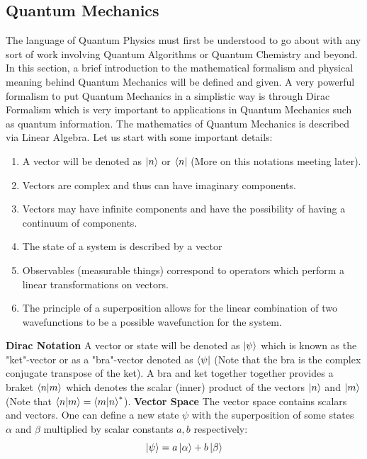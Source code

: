 \subsection{Quantum Mechanics}
The language of Quantum Physics must first be understood to go about with any sort of work involving Quantum Algorithms or Quantum Chemistry and beyond. In this section, a brief introduction to the mathematical formalism and physical meaning behind Quantum Mechanics will be defined and given. A very powerful formalism to put Quantum Mechanics in a simplistic way is through Dirac Formalism which is very important to applications in Quantum Mechanics such as quantum information. The mathematics of Quantum Mechanics is described via Linear Algebra. Let us start with some important details:
\begin{enumerate}
    \item A vector will be denoted as $\ket{n}$ or $\bra{n}$ (More on this notations meeting later).
    \item Vectors are complex and thus can have imaginary components. 
    \item Vectors may have infinite components and have the possibility of having a continuum of components.
    \item The state of a system is described by a vector
    \item Observables (measurable things) correspond to operators which perform a linear transformations on vectors.
    \item The principle of a superposition allows for the linear combination of two wavefunctions to be a possible wavefunction for the system.
\end{enumerate}
\newline
\textbf{Dirac Notation}\newline
A vector or state will be denoted as $\ket{\psi}$ which is known as the "ket"-vector or as a "bra"-vector denoted as $\bra{\psi}$ (Note that the bra is the complex conjugate transpose of the ket). A bra and ket together together provides a braket $\braket{n|m}$ which denotes the scalar (inner) product of the vectors $\ket{n}$ and $\ket{m}$ (Note that $\braket{n|m} = \braket{m|n}^{*}$). \newline
\textbf{Vector Space} \newline
The vector space contains scalars and vectors. One can define a new state $\psi$ with the superposition of some states $\alpha$ and $\beta$ multiplied by scalar constants $a, b$ respectively:
\begin{equation}
    \ket{\psi} = a\ket{\alpha} + b \ket{\beta}
\end{equation}
